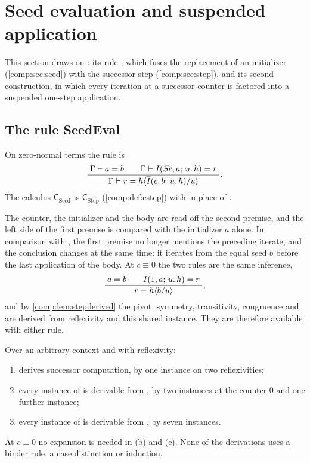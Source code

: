\section{Seed evaluation and suspended application}
\label{comp:sec:seedeval}

This section draws on : its rule ,
which fuses the replacement of an initializer (\cref{comp:sec:seed}) with
the successor step (\cref{comp:sec:step}), and its second construction, in
which every iteration at a successor counter is factored into a suspended
one-step application.

\subsection{The rule SeedEval}

\begin{definition}
\label{comp:def:seedeval}
On zero-normal terms the rule  is
\[
 \dfrac{\;\Gamma\vdash a=b\qquad\Gamma\vdash I(S c,a;\,u.\,h)=r\;}{\;\Gamma\vdash r=h\langle\overline{I}(c,b;\,u.\,h)/u\rangle\;}.
\]
The calculus $\mathsf{C}_{\mathrm{Seed}}$ is
$\mathsf{C}_{\mathrm{Step}}$ (\cref{comp:def:cstep}) with 
in place of .
\end{definition}

The counter, the initializer and the body are read off the second premise,
and the left side of the first premise is compared with the initializer $a$
alone. In comparison with , the first premise no longer
mentions the preceding iterate, and the conclusion changes at the same time:
it iterates from the equal seed $b$ before the last application of the
body. At $c\equiv0$ the two rules are the same inference,
\[
 \dfrac{\;a=b\qquad I(1,a;\,u.\,h)=r\;}{\;r=h\langle b/u\rangle\;},
\]
and by \cref{comp:lem:stepderived} the pivot, symmetry, transitivity,
congruence and  are derived from reflexivity and this shared
instance. They are therefore available with either rule.

\begin{lemma}
\label{comp:lem:seedstep}
Over an arbitrary context and with reflexivity:
\begin{enumerate}[label=(\alph*)]
\item {} derives successor computation, by one instance on
 two reflexivities;
\item every instance of  is derivable from
 , by two instances at the counter $0$ and one further
 instance;
\item every instance of  is derivable from
 , by seven instances.
\end{enumerate}
At $c\equiv0$ no expansion is needed in (b) and (c). None of the derivations
uses a binder rule, a case distinction or induction.
\end{lemma}

